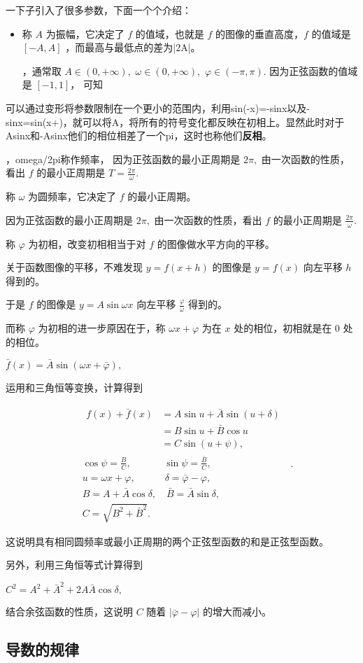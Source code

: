 一下子引入了很多参数，下面一个个介绍：
\begin{itemize}
\item 称 $A$ 为振幅，它决定了 $f$ 的值域，也就是 $f$ 的图像的垂直高度，$f$ 的值域是 $\left[-A,A\right]$ ，而最高与最低点的差为|2A|。

，通常取 $A\in\left(0,+\infty\right),$ $\omega\in\left(0,+\infty\right),$ $\varphi\in\left(-\pi,\pi\right).$ 
因为正弦函数的值域是 $\left[-1,1\right]$， 可知 
\end{itemize}


可以通过变形将参数限制在一个更小的范围内，利用sin(-x)=-sinx以及-sinx=sin(x+\pi)，就可以将A，将所有的符号变化都反映在初相上。显然此时对于Asin\omgea x和-Asin\omega x他们的相位相差了一个pi，这时也称他们\textbf{反相}。

，omega/2pi称作频率，
因为正弦函数的最小正周期是 $2\pi,$ 由一次函数的性质，看出 $f$ 的最小正周期是 $T=\tfrac{2\pi}{\omega}.$ 



称 $\omega$ 为圆频率，它决定了 $f$ 的最小正周期。

因为正弦函数的最小正周期是 $2\pi,$ 由一次函数的性质，看出 $f$ 的最小正周期是 $\tfrac{2\pi}{\omega}.$ 

称 $\varphi$ 为初相，改变初相相当于对 $f$ 的图像做水平方向的平移。

关于函数图像的平移，不难发现 $y=f\left(x+h\right)$ 的图像是 $y=f\left(x\right)$ 向左平移 $h$ 得到的。

于是 $f$ 的图像是 $y=A\sin\omega x$ 向左平移 $\tfrac{\varphi}{\omega}$ 得到的。

而称 $\varphi$ 为初相的进一步原因在于，称 $\omega x+\varphi$ 为在 $x$ 处的相位，初相就是在 $0$ 处的相位。

$\bar f\left(x\right)=\bar A\sin\left(\omega x+\bar\varphi\right),$ 

运用和三角恒等变换，计算得到

\begin{equation}
\begin{split}&\begin{split}f\left(x\right)+\bar f\left(x\right)&=A\sin u+\bar A\sin\left(u+\delta\right)\\&=B\sin u+\bar B\cos u\\&=C\sin\left(u+\psi\right),\end{split}\\&\cos\psi=\frac BC,\qquad\quad\,\, \sin\psi=\frac{\bar B}{C},\\&u=\omega x+\varphi,\qquad\quad \delta=\bar\varphi-\varphi,\\&B=A+\bar A\cos\delta,\quad\bar B=\bar A\sin\delta,\\&C=\sqrt{B^2+\bar B^2}.\end{split}~.
\end{equation}


这说明具有相同圆频率或最小正周期的两个正弦型函数的和是正弦型函数。

另外，利用三角恒等式计算得到

$C^2=A^2+\bar A^2+2A\bar A\cos\delta,$ 

结合余弦函数的性质，这说明 $C$ 随着 $\left|\bar\varphi-\varphi\right|$ 的增大而减小。


\subsection{导数的规律}